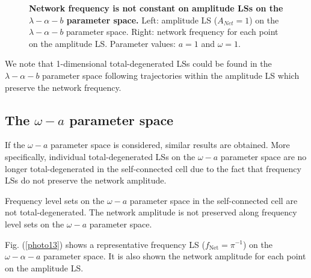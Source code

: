 \begin{figure}[h]
  \caption{\textbf{Network frequency is not constant on amplitude LSs on the $\lambda-\alpha-b$ parameter space.} Left: amplitude LS ($A_{Net} = 1$) on the $\lambda-\alpha-b$ parameter space. Right: network frequency for each point on the amplitude LS. Parameter values: $a = 1$ and $\omega = 1$.}
  \label{photo12}
\end{figure}

We note that 1-dimensional total-degenerated LSs could be found in the $\lambda-\alpha-b$ parameter space following trajectories within the amplitude LS which preserve the network frequency.

\subsection{The $\omega-a$ parameter space}
If the $\omega-a$ parameter space is considered, similar results are obtained. More specifically, individual total-degenerated LSs on the $\omega-a$ parameter space are no longer total-degenerated in the self-connected cell due to the fact that frequency LSs do not preserve the network amplitude.

\begin{Statement}
Frequency level sets on the $\omega-a$ parameter space in the self-connected cell are not total-degenerated. The network amplitude is not preserved along frequency level sets on the $\omega-a$ parameter space.
\end{Statement}

Fig. (\ref{photo13}) shows a representative frequency LS ($f_{\text{Net}} = \pi^{-1}$) on the $\omega-\alpha-a$ parameter space. It is also shown the network amplitude for each point on the amplitude LS. 

